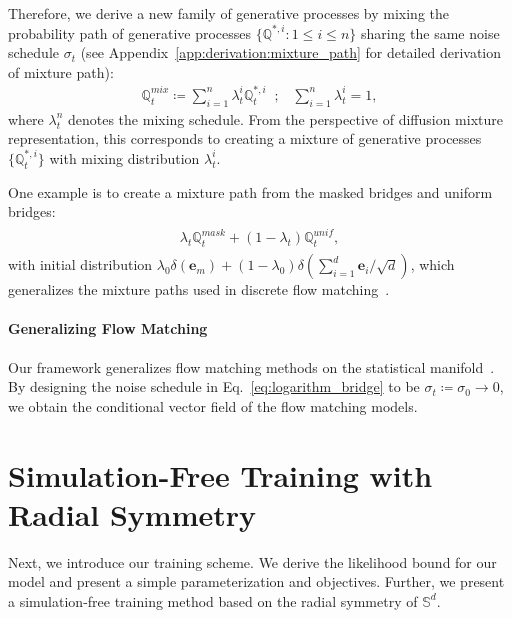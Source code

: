 Therefore, we derive a new family of generative processes by mixing the probability path of generative processes $\{\mathbb{Q}^{\ast,i}: 1\leq i\leq n\}$ sharing the same noise schedule $\sigma_t$ (see Appendix~\ref{app:derivation:mixture_path} for detailed derivation of mixture path):
\begin{align}
    \mathbb{Q}^{mix}_t \coloneqq \sum^{n}_{i=1} \lambda^{i}_t \mathbb{Q}^{\ast,i}_t \;\;;\;\;\; \sum^{n}_{i=1} \lambda^{i}_t = 1,
\label{eq:mixture_path}
\end{align}
where $\lambda^{n}_t$ denotes the mixing schedule.
From the perspective of diffusion mixture representation, this corresponds to creating a mixture of generative processes $\{\mathbb{Q}^{\ast,i}_t\}$ with mixing distribution $\lambda^{i}_t$.

One example is to create a mixture path from the masked bridges and uniform bridges:
\begin{align}
\begin{split}
    \lambda_t\mathbb{Q}^{mask}_t + (1-\lambda_t)\mathbb{Q}^{unif}_t,
\end{split}
\label{eq:mixture_path_mask_unif}
\end{align}
with initial distribution $\lambda_0 \delta(\bm{e}_m) + (1-\lambda_0) \delta(\sum^d_{i=1} \bm{e}_i / \sqrt{d})$, which generalizes the mixture paths used in discrete flow matching~\citep{shaul2024flow}.


\paragraph{Generalizing Flow Matching}
Our framework generalizes flow matching methods on the statistical manifold~\citep{cheng2024categorical,davis2024fisherflow}.
By designing the noise schedule in Eq.~\eqref{eq:logarithm_bridge} to be $\sigma_t\coloneqq\sigma_0\rightarrow 0$, we obtain the conditional vector field of the flow matching models.



\section{Simulation-Free Training with Radial Symmetry} \label{sec:training}
Next, we introduce our training scheme.
We derive the likelihood bound for our model and present a simple parameterization and objectives. Further, we present a simulation-free training method based on the radial symmetry of $\mathbb{S}^d$.


